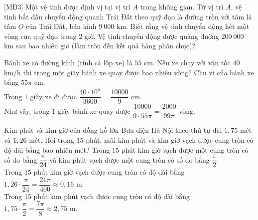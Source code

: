 \begin{bt}%
[MĐ3]
	Một vệ tinh được định vị tại vị trí $A$ trong không gian. Từ vị trí $A$, vệ tinh bắt đầu chuyển động quanh Trái Đất theo quỹ đạo là đường tròn với tâm là tâm $O$ của Trái Đất, bán kính $9~000$ km. Biết rằng vệ tinh chuyển động hết một vòng của quỹ đạo trong $2$ giờ. Vệ tinh chuyển động được quãng đường $200~000$ km sau bao nhiêu giờ (làm tròn đến kết quả hàng phần chục)?
\end{bt}

\begin{bt}%

	Bánh xe có đường kính (tính cả lốp xe) là $55$ cm. Nếu xe chạy với vận tốc $40$ km/h thì trong một giây bánh xe quay được bao nhiêu vòng?
	\loigiai
	{
		Chu vi của bánh xe bằng $55\pi$ cm.\\
		Trong $1$ giây xe đi được $\dfrac{40\cdot 10^5}{3600} = \dfrac{10000}{9}$ cm.\\
		Như vây, trong $1$ giây bánh xe quay được $\dfrac{10000}{9 \cdot 55\pi} = \dfrac{2000}{99\pi}$ vòng.
	}
\end{bt}

\begin{bt}%

	Kim phút và kim giờ của đồng hồ lớn Bưu điện Hà Nội theo thứ tự dài $1{,}75$ mét và $1{,}26$ mét. Hỏi trong $15$ phút, mũi kim phút và kim giờ vạch được cung tròn có độ dài bằng bao nhiêu mét?
	\loigiai
	{
		Trong $15$ phút kim giờ vạch được một cung tròn có số đo bằng $\dfrac{\pi}{24}$ và kim phút vạch được một cung tròn có số đo bằng $\dfrac{\pi}{2}$.\\
		Trong $15$ phút kim giờ vạch được cung tròn có độ dài bằng $1{,}26\cdot \dfrac{\pi}{24} = \dfrac{21\pi}{400} \approx 0{,}16$ m.\\
		Trong $15$ phút kim phút vạch được cung tròn có độ dài bằng $1{,}75 \cdot \dfrac{\pi}{2} = \dfrac{7\pi}{8} \approx 2{,}75$ m.
	}
\end{bt}

